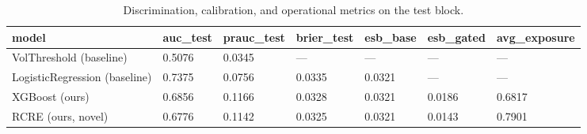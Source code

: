\begin{table}[t]
\centering
\small
\begin{tabular}{lllllll}
\toprule
model & auc_test & prauc_test & brier_test & esb_base & esb_gated & avg_exposure \\
\midrule
VolThreshold (baseline) & 0.5076 & 0.0345 & — & — & — & — \\
LogisticRegression (baseline) & 0.7375 & 0.0756 & 0.0335 & 0.0321 & — & — \\
XGBoost (ours) & 0.6856 & 0.1166 & 0.0328 & 0.0321 & 0.0186 & 0.6817 \\
RCRE (ours, novel) & 0.6776 & 0.1142 & 0.0325 & 0.0321 & 0.0143 & 0.7901 \\
\bottomrule
\end{tabular}
\caption{Discrimination, calibration, and operational metrics on the test block.}
\label{tab:main_results}
\end{table}